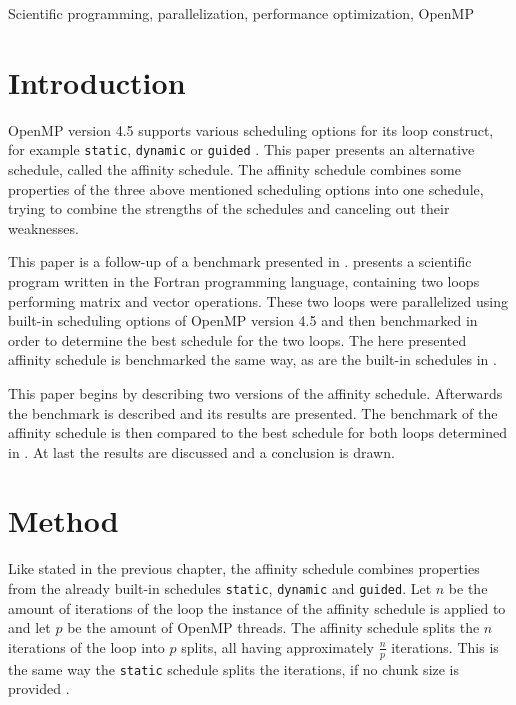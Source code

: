 \documentclass[twoside,11pt]{article}
\title{\titl}
\author{}
\begin{document}
\maketitle

\begin{abstract}
\end{abstract}

\begin{keywords}
Scientific programming, parallelization,
performance optimization, OpenMP
\end{keywords}

\section{Introduction} %

OpenMP version 4.5 supports various scheduling options for
its loop construct, for example \texttt{static},
\texttt{dynamic} or \texttt{guided}
\citep[see][Chapter 2]{omp}.
This paper presents an alternative schedule, called the
affinity schedule.
The affinity schedule combines some properties of the three
above mentioned scheduling options into one schedule,
trying to combine the strengths of the schedules and
canceling out their weaknesses.

This paper is a follow-up of a benchmark presented in
\citet{b1}.
\citet{b1} presents a scientific program written in the
Fortran programming language, containing two loops
performing matrix and vector operations.
These two loops were parallelized using built-in scheduling
options of OpenMP version 4.5 and then benchmarked in order
to determine the best schedule for the two loops.
The here presented affinity schedule is benchmarked the
same way, as are the built-in schedules in \citet{b1}.

This paper begins by describing two versions of the
affinity schedule. Afterwards the benchmark is described
and its results are presented. The benchmark of the
affinity schedule is then compared to the best schedule for
both loops determined in \citet{b1}.
At last the results are discussed and a conclusion is
drawn.


\section{Method} %

Like stated in the previous chapter, the affinity schedule
combines properties from the already built-in schedules
\texttt{static}, \texttt{dynamic} and \texttt{guided}.
Let $n$ be the amount of iterations of the loop the
instance of the affinity schedule is applied to and let $p$
be the amount of OpenMP threads.
The affinity schedule splits the $n$ iterations of the
loop into $p$ splits, all having approximately
$\frac{n}{p}$ iterations.
This is the same way the \texttt{static} schedule splits
the iterations, if no chunk size is provided
\citep[see][Chapter 2]{omp}.
\end{document}
